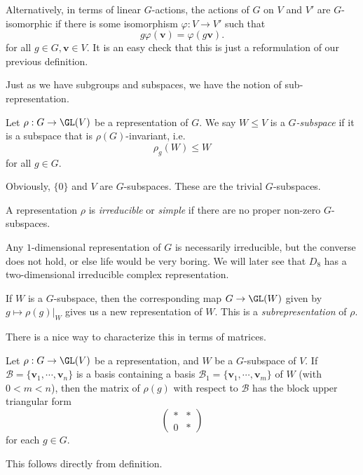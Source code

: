 \documentclass[a4paper]{article}
\begin{document}
Alternatively, in terms of linear $G$-actions, the actions of $G$ on $V$ and $V'$ are $G$-isomorphic if there is some isomorphism $\varphi: V \to V'$ such that
\[
  g \varphi(\mathbf{v}) = \varphi(g\mathbf{v}).
\]
for all $g \in G, \mathbf{v} \in V$. It is an easy check that this is just a reformulation of our previous definition.

Just as we have subgroups and subspaces, we have the notion of sub-representation.
\begin{defi}[$G$-subspace]
  Let $\rho: G \to \GL(V)$ be a representation of $G$. We say $W \leq V$ is a \emph{$G$-subspace} if it is a subspace that is $\rho(G)$-invariant, i.e.
  \[
    \rho_g(W) \leq W
  \]
  for all $g \in G$.
\end{defi}

Obviously, $\{0\}$ and $V$ are $G$-subspaces. These are the trivial $G$-subspaces.

\begin{defi}
  A representation $\rho$ is \emph{irreducible} or \emph{simple} if there are no proper non-zero $G$-subspaces.
\end{defi}

\begin{eg}
  Any $1$-dimensional representation of $G$ is necessarily irreducible, but the converse does not hold, or else life would be very boring. We will later see that $D_8$ has a two-dimensional irreducible complex representation.
\end{eg}

\begin{defi}[Subrepresentation]
  If $W$ is a $G$-subspace, then the corresponding map $G \to \GL(W)$ given by $g \mapsto \rho(g)|_W$ gives us a new representation of $W$. This is a \emph{subrepresentation} of $\rho$.
\end{defi}

There is a nice way to characterize this in terms of matrices.
\begin{lemma}
  Let $\rho: G \to \GL(V)$ be a representation, and $W$ be a $G$-subspace of $V$. If $\mathcal{B} = \{\mathbf{v}_1, \cdots, \mathbf{v}_n\}$ is a basis containing a basis $\mathcal{B}_1 = \{\mathbf{v}_1, \cdots, \mathbf{v}_m\}$ of $W$ (with $0 < m < n$), then the matrix of $\rho(g)$ with respect to $\mathcal{B}$ has the block upper triangular form
  \[
    \begin{pmatrix}
      * & *\\
      0 & *
    \end{pmatrix}
  \]
  for each $g \in G$.
\end{lemma}
This follows directly from definition.
\end{document}
